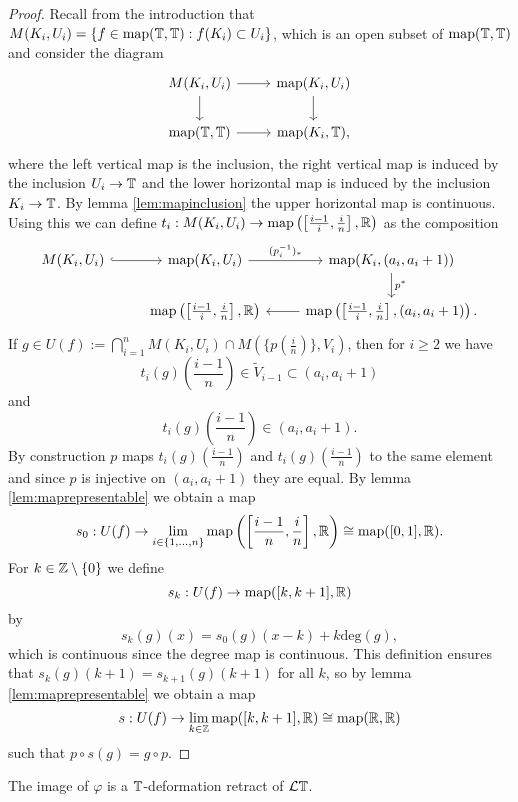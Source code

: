 \begin{proof}
Recall from the introduction that $M(K_i, U_i) = \{f\in \mathrm{map}(\mathbb{T},\mathbb{T}):f(K_i)\subset U_i\}$,
which is an open subset of $\mathrm{map}(\mathbb{T},\mathbb{T})$ and consider the diagram
$$
\begin{tikzcd}
M(K_i, U_i)\arrow{r}\arrow{d}
&\map(K_i, U_i)\arrow{d}\\
\map(\TT,\TT)\arrow{r}
&\map(K_i, \TT),
\end{tikzcd}
$$
where the left vertical map is the inclusion, the right vertical map is induced
by the inclusion $U_i\to \mathbb{T}$ and the lower horizontal map is induced
by the inclusion $K_i\to \mathbb{T}$. By lemma \ref{lem:mapinclusion} the upper
horizontal map is continuous. Using this we can define $t_i:M(K_i, U_i) \to 
\mathrm{map}\left(\left[\frac{i-1}{i}, \frac{i}{n}\right], \mathbb{R}\right)$ as the composition
\[
\begin{tikzcd}
M(K_i, U_i)\arrow[hookrightarrow]{r}
&\map(K_i, U_i)
\arrow{r}{(p_i^{-1})_\ast} 
&\map(K_i, (a_i, a_i +1))
\arrow{d}{p^\ast}\\
&\map\left(\left[\frac{i-1}{i}, \frac{i}{n}\right], \RR\right)
&\map\left(\left[\frac{i-1}{i}, \frac{i}{n}\right], (a_i, a_i +1)\right).
\arrow{l}
\end{tikzcd}
\]
If $g\in U(f):=\bigcap_{i = 1}^n M(K_i, U_i)\cap M(\{p(\frac{i}{n})\}, V_i)$, then 
for $i\ge 2$ we have
$$t_i(g)\left(\frac{i-1}{n}\right)\in \tilde V_{i-1} \subset(a_{i}, a_i+1)$$ 
and  
$$t_i(g)\left(\frac{i-1}{n}\right)\in (a_i, a_i+1).$$ By construction $p$ maps 
$t_i(g)(\frac{i-1}{n})$ and $t_i(g)(\frac{i-1}{n})$ to the same element
and since $p$ is injective on $(a_i, a_i+1)$ they are equal. By lemma \ref{lem:maprepresentable}
we obtain a map
$$s_0:U(f)
\to \lim_{i\in \{1,\ldots, n\}} \mathrm{map}\left(\left[\frac{i-1}{n},
\frac{i}{n}\right],\mathbb{R}\right)\cong \mathrm{map}([0,1],\mathbb{R}).$$
For $k\in \mathbb{Z}\setminus \{0\}$ we define
$$s_k:U(f)\to \mathrm{map}([k, k+1],\mathbb{R})$$
by
$$s_k(g)(x) = s_0(g)(x-k) + k\mathrm{deg}(g),$$
which is continuous since the degree map is continuous. This
definition ensures that $s_k(g)(k+1) = s_{k+1}(g)(k+1)$ for all $k$,
so by lemma \ref{lem:maprepresentable} we obtain a map
$$s:U(f)\to \lim_{k\in \mathbb{Z}} \mathrm{map}([k, k+1], \mathbb{R})\cong \mathrm{map}(\mathbb{R},\mathbb{R})$$
such that $p\circ s(g) = g\circ p$.
\end{proof}








\begin{prop}
The image of $\varphi$ is a $\mathbb{T}$-deformation retract of $\mathcal{L}\mathbb{T}$.
\end{prop}

